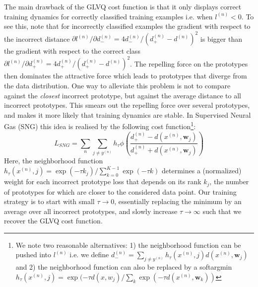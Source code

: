 \documentclass{esannV2}
\begin{document}
The main drawback of the GLVQ cost function is that it only displays correct training dynamics for correctly classified training examples\cite{sato1996generalized} i.e. when $l^{(n)} < 0$. To see this, note that for incorrectly classified examples the gradient with respect to the incorrect distance $\partial l^{(n)} / \partial d^{(n)}_- = 4d^{(n)}_-/(d^{(n)}_+ - d^{(n)})^2$ is bigger than the gradient with respect to the correct class $\partial l^{(n)} / \partial d^{(n)}_+ = 4d^{(n)}_+/(d^{(n)}_+ - d^{(n)})^2$. The repelling force on the prototypes then dominates the attractive force which leads to prototypes that diverge from the data distribution. One way to alleviate this problem is not to compare against the \emph{closest} incorrect prototype, but against the average distance to all incorrect prototypes. This smears out the repelling force over several prototypes, and makes it more likely that training dynamics are stable. In Supervised Neural Gas (SNG) \cite{SNG} this idea is realised by the following cost function\footnote{We note two reasonable alternatives: 1) the neighborhood function can be pushed into $l^{(n)}$ i.e. we define $d^{(n)}_- = \sum_{j \neq y^{(n)}} h_\tau(x^{(n)}, j) d(x^{(n)}, \mathbf{w}_j)$ and 2) the neighborhood function can also be replaced by a softargmin $h_\tau(x^{(n)}, j) = \exp(-\tau d(x, w_j)/\sum_k \exp(-\tau d(x^{(n)}, \mathbf{w}_k))$}:
\begin{equation}
 L_{SNG} = \sum_n \sum_{j\neq y^{(n)}} h_\tau \phi\left(\frac{d^{(n)}_+ - d(x^{(n)}, \mathbf{w}_j)}{d^{(n)}_+ + d(x^{(n)}, \mathbf{w}_j)}\right)
\end{equation}
Here, the neighborhood function $h_\tau(x^{(n)}, j) = \exp(-\tau k_j)/ \sum_{k=0}^{K-1} \exp(-\tau k)$ determines a (normalized) weight for each incorrect prototype loss that depends on its rank $k_j$, the number of prototypes for which are closer to the considered data point. Our training strategy is to start with small $\tau \rightarrow 0$, essentially replacing the minimum by an average over all incorrect prototypes, and slowly increase $\tau \rightarrow \infty$ such that we recover the GLVQ cost function. 

\end{document}
